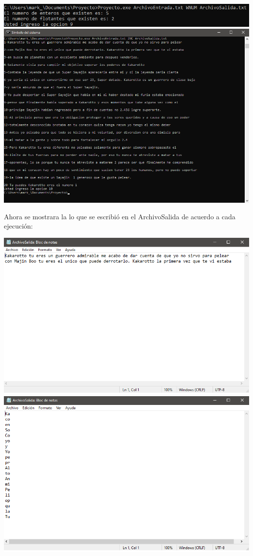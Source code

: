\documentclass[12pt,letterpaper]{report}
\begin{document}
\begin{multicols}{2}
\includegraphics[scale=0.35]{Salida9}\\
\includegraphics[scale=0.35]{Salida10}
\end{multicols}

\newpage
Ahora se mostrara la lo que se escribió en el ArchivoSalida de acuerdo a cada ejecución:\\

\begin{multicols}{2}
\includegraphics[scale=0.35]{ArchivoSalida1}
\includegraphics[scale=0.35]{ArchivoSalida2}
\end{multicols}
\end{document}
